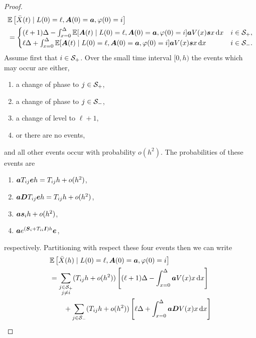 \begin{proof}
	\begin{align}
		\nonumber&\mathbb E\left[\bar X(t)\mid L(0)=\ell,\bs A(0)=\bs a,\varphi(0)=i\right]   
%
	\\&=  \begin{cases}
			(\ell+1)\Delta - \int_{x=0}^\Delta \mathbb E[\bs A(t) \mid L(0)=\ell,\bs A(0)=\bs a,\varphi(0)=i ] \bs a V(x)\bs s x \wrt x & i \in\calS_+,\\
			\ell\Delta + \int_{x=0}^\Delta \mathbb E[\bs A(t) \mid L(0)=\ell,\bs A(0)=\bs a,\varphi(0)=i ] \bs a V(x)\bs s x \wrt x & i \in\calS_-.
		\end{cases}
		\label{eqn: askgh q}
	\end{align}
	Assume first that \(i\in\mathcal{S}_+\). Over the small time interval \([0,h)\) the events which may occur are either,
	\begin{enumerate}
		\item\label{item: kfj1} a change of phase to \(j\in\mathcal{S}_+\), 
		\item\label{item: kfj2} a change of phase to \(j\in\mathcal{S}_-\), 
		\item\label{item: kfj3} a change of level to \(\ell+1\), 
		\item\label{item: kfj4} or there are no events, 
	\end{enumerate}
	and all other events occur with probability \(o(h^2)\). The probabilities of these events are 
	\begin{enumerate}
		\item\label{item: kfj12} \(\boldsymbol a T_{ij}\boldsymbol e h = T_{ij}h + o(h^2)\), 
		\item\label{item: kfj22} \(\boldsymbol a \boldsymbol D T_{ij}\boldsymbol e h = T_{ij}h + o(h^2)\), 
		\item\label{item: kfj32} \(\boldsymbol a \boldsymbol s_i h + o(h^2)\), 
		\item\label{item: kfj42} \(\boldsymbol a e^{(\boldsymbol S_i + T_{ii}\boldsymbol I)h}\boldsymbol e\), 
	\end{enumerate}
	respectively. 
	Partitioning with respect these four events then we can write 
	\begin{align}
		&\mathbb E\left[\bar X(h)\mid L(0)=\ell,\bs A(0)=\bs a,\varphi(0)=i\right] \nonumber
		\\&= \sum_{\substack{j\in\mathcal S_+\\j\neq i}}(T_{ij}h + o(h^2)) \left[ (\ell+1)\Delta - \int_{x=0}^\Delta \bs a V(x) x \wrt x\right] \nonumber 
		\\&\qquad{} + \sum_{j\in\mathcal S_-}(T_{ij}h + o(h^2)) \left[ \ell\Delta + \int_{x=0}^\Delta \bs a\bs D V(x) x \wrt x\right] \nonumber

\end{align}
\end{proof}
